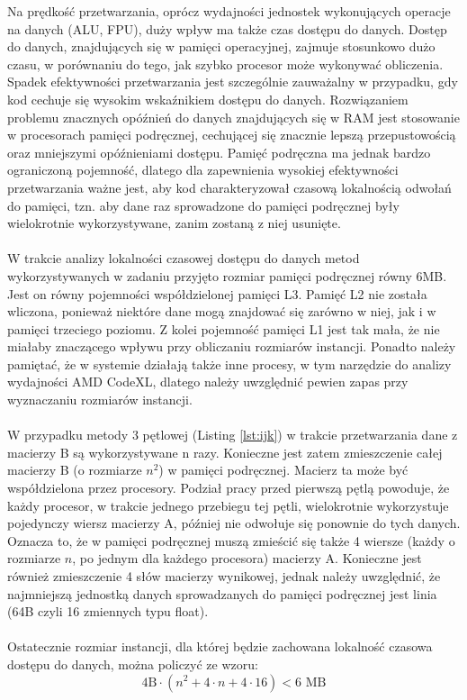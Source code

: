 \documentclass[12pt,a4paper]{article}
\begin{document}
Na prędkość przetwarzania, oprócz wydajności jednostek wykonujących operacje na danych (ALU, FPU), duży wpływ ma także czas dostępu do danych. Dostęp do danych, znajdujących się w pamięci operacyjnej, zajmuje stosunkowo dużo czasu, w porównaniu do tego, jak szybko procesor może wykonywać obliczenia. Spadek efektywności przetwarzania jest szczególnie zauważalny w przypadku, gdy kod cechuje się wysokim wskaźnikiem dostępu do danych. Rozwiązaniem problemu znacznych opóźnień do danych znajdujących się w RAM jest stosowanie w procesorach pamięci podręcznej, cechującej się znacznie lepszą przepustowością oraz mniejszymi opóźnieniami dostępu. Pamięć podręczna ma jednak bardzo ograniczoną pojemność, dlatego dla zapewnienia wysokiej efektywności przetwarzania ważne jest, aby kod charakteryzował czasową lokalnością odwołań do pamięci, tzn. aby dane raz sprowadzone do pamięci podręcznej były wielokrotnie wykorzystywane, zanim zostaną z niej usunięte.\\
\\
W trakcie analizy lokalności czasowej dostępu do danych metod wykorzystywanych w zadaniu przyjęto rozmiar pamięci podręcznej równy 6MB. Jest on równy pojemności współdzielonej pamięci L3. Pamięć L2 nie została wliczona, ponieważ niektóre dane mogą znajdować się zarówno w niej, jak i w pamięci trzeciego poziomu. Z kolei pojemność pamięci L1 jest tak mała, że nie miałaby znaczącego wpływu przy obliczaniu rozmiarów instancji. Ponadto należy pamiętać, że w systemie działają także inne procesy, w tym narzędzie do analizy wydajności AMD CodeXL, dlatego należy uwzględnić pewien zapas przy wyznaczaniu rozmiarów instancji.\\
\\
W przypadku metody 3 pętlowej (Listing \ref{lst:ijk}) w trakcie przetwarzania dane z macierzy B są wykorzystywane n razy. Konieczne jest zatem zmieszczenie całej macierzy B (o rozmiarze $n^2$) w pamięci podręcznej. Macierz ta może być współdzielona przez procesory.
Podział pracy przed pierwszą pętlą powoduje, że każdy procesor, w trakcie jednego przebiegu tej pętli, wielokrotnie wykorzystuje pojedynczy wiersz macierzy A, później nie odwołuje się ponownie do tych danych. Oznacza to, że w pamięci podręcznej muszą zmieścić się także 4 wiersze (każdy o rozmiarze $n$, po jednym dla każdego procesora) macierzy A.
Konieczne jest również zmieszczenie 4 słów macierzy wynikowej, jednak należy uwzględnić, że najmniejszą jednostką danych sprowadzanych do pamięci podręcznej jest linia (64B czyli 16 zmiennych typu float).\\
\\
Ostatecznie rozmiar instancji, dla której będzie zachowana lokalność czasowa dostępu do danych, można policzyć ze wzoru:
\begin{equation} \label{formula:lok_czas_3p}
4\text{B} \cdot \left( n^2 + 4\cdot n + 4 \cdot 16 \right) < 6 \text{ MB}
\end{equation}
\end{document}
